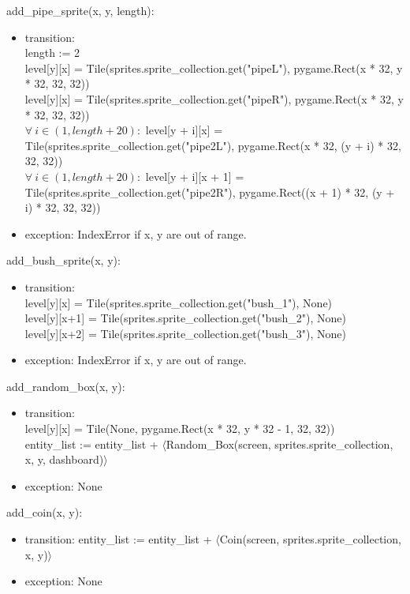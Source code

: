 \documentclass[12pt]{article}
\begin{document}
add\_pipe\_sprite(x, y, length):
\begin{itemize}
    \item transition:\\ length := 2\\
    level[y][x] = Tile(sprites.sprite\_collection.get("pipeL"), pygame.Rect(x * 32, y * 32, 32, 32))\\
    level[y][x] = Tile(sprites.sprite\_collection.get("pipeR"), pygame.Rect(x * 32, y * 32, 32, 32))\\
    $\forall\ i \in (1, length + 20) : $ level[y + i][x] = Tile(sprites.sprite\_collection.get("pipe2L"), pygame.Rect(x * 32, (y + i) * 32, 32, 32))\\
    $\forall\ i \in (1, length + 20) : $ level[y + i][x + 1] = Tile(sprites.sprite\_collection.get("pipe2R"), pygame.Rect((x + 1) * 32, (y + i) * 32, 32, 32))\\
    \item exception: IndexError if x, y are out of range.
\end{itemize}

add\_bush\_sprite(x, y):
\begin{itemize}
    \item transition: \\
    level[y][x] = Tile(sprites.sprite\_collection.get("bush\_1"), None)\\
    level[y][x+1] = Tile(sprites.sprite\_collection.get("bush\_2"), None)\\
    level[y][x+2] = Tile(sprites.sprite\_collection.get("bush\_3"), None)\\
    \item exception: IndexError if x, y are out of range.
\end{itemize}

add\_random\_box(x, y):
\begin{itemize}
    \item transition:\\ level[y][x] = Tile(None, pygame.Rect(x * 32, y * 32 - 1, 32, 32))\\
    entity\_list := entity\_list + $\langle$Random\_Box(screen, sprites.sprite\_collection, x, y, dashboard)$\rangle$
    \item exception: None
\end{itemize}

add\_coin(x, y):
\begin{itemize}
    \item transition: entity\_list := entity\_list + $\langle$Coin(screen, sprites.sprite\_collection, x, y)$\rangle$
    \item exception: None
\end{itemize}
\end{document}
